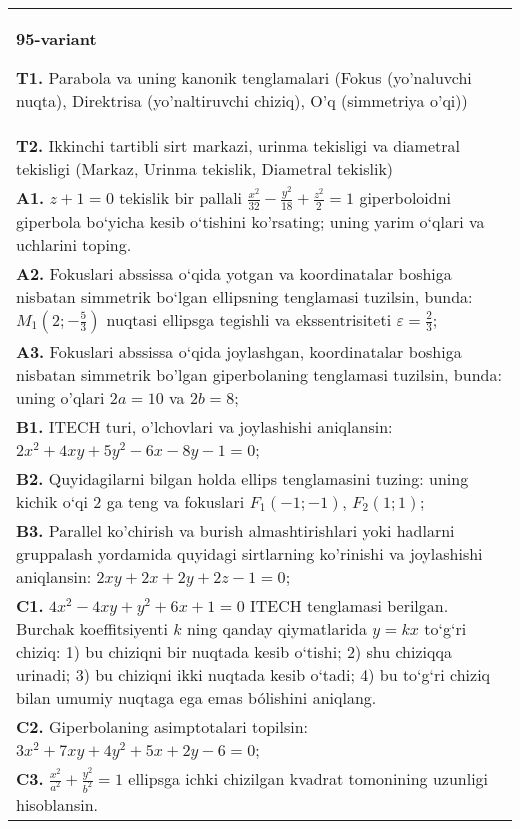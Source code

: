 \documentclass{article}
\begin{document}
\begin{tabular}{m{17cm}}
\textbf{95-variant}
\newline

\textbf{T1.} Parabola va uning kanonik tenglamalari (Fokus (yo’naluvchi nuqta), Direktrisa (yo’naltiruvchi chiziq), O’q (simmetriya o’qi)) \\
\textbf{T2.} Ikkinchi tartibli sirt markazi, urinma tekisligi va diametral tekisligi (Markaz, Urinma tekislik, Diametral tekislik) \\
\textbf{A1.} $z+1=0$ tekislik bir pallali $\frac{x^2}{32}-\frac{y^2}{18}+\frac{z^2}{2}=1$ giperboloidni giperbola bo‘yicha kesib o‘tishini ko'rsating; uning yarim o‘qlari va uchlarini toping. \\
\textbf{A2.} Fokuslari abssissa o‘qida yotgan va koordinatalar boshiga nisbatan simmetrik bo‘lgan ellipsning tenglamasi tuzilsin, bunda: $M_1\left(2 ;-\frac{5}{3}\right)$ nuqtasi ellipsga tegishli va ekssentrisiteti $\varepsilon=\frac{2}{3}$; \\
\textbf{A3.} Fokuslari abssissa o‘qida joylashgan, koordinatalar boshiga nisbatan simmetrik bo'lgan giperbolaning tenglamasi tuzilsin, bunda: uning o'qlari $2 a=10$ va $2 b=8$; \\
\textbf{B1.} ITECH turi, o'lchovlari va joylashishi aniqlansin: $2 x^2+4 x y+5 y^2-6 x-8 y-1=0$; \\
\textbf{B2.} Quyidagilarni bilgan holda ellips tenglamasini tuzing: uning kichik o‘qi 2 ga teng va fokuslari $F_1 (-1;-1) $, $F_2 (1; 1) $; \\
\textbf{B3.} Parallel ko'chirish va burish almashtirishlari yoki hadlarni gruppalash yordamida quyidagi sirtlarning ko'rinishi va joylashishi aniqlansin: $2 x y+2 x+2 y+2 z-1=0$; \\
\textbf{C1.} $4 x^2-4 x y+y^2+6 x+1=0$ ITECH tenglamasi berilgan. Burchak koeffitsiyenti $k$ ning qanday qiymatlarida $y=kx$ to‘g‘ri chiziq: 1) bu chiziqni bir nuqtada kesib o‘tishi; 2) shu chiziqqa urinadi; 3) bu chiziqni ikki nuqtada kesib o‘tadi; 4) bu to‘g‘ri chiziq bilan umumiy nuqtaga ega emas bólishini aniqlang. \\
\textbf{C2.} Giperbolaning asimptotalari topilsin: $3 x^2+7 x y+4 y^2+5 x+2 y-6=0$; \\
\textbf{C3.} $\frac{x^2}{a^2}+\frac{y^2}{b^2}=1$ ellipsga ichki chizilgan kvadrat tomonining uzunligi hisoblansin. \\

\end{tabular}
\vspace{1cm}
\end{document}
